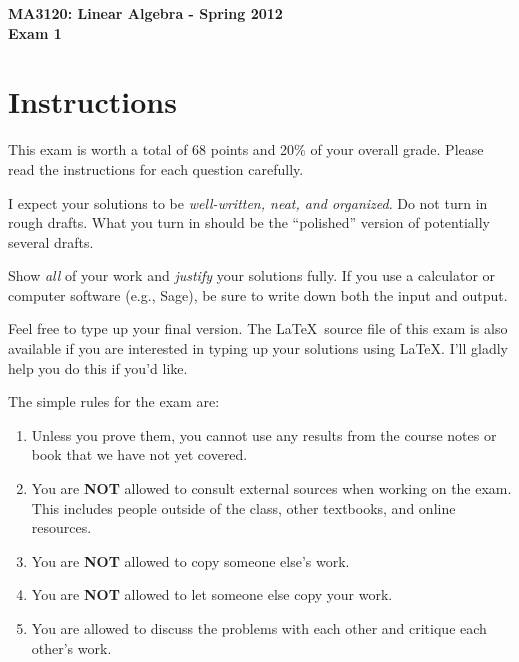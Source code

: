 \documentclass[11pt]{article}
\theoremstyle{definition}
\begin{document}
\begin{center}

{\Large\bf MA3120: Linear Algebra - Spring 2012}\\
\smallskip
{\Large\bf Exam 1}

\bigskip

  
  \bigskip
  

\end{center}

\section*{Instructions}

This exam is worth a total of 68 points and 20\% of your overall grade.  Please read the instructions for each question carefully.

\bigskip

I expect your solutions to be \emph{well-written, neat, and organized}.  Do not turn in rough drafts.  What you turn in should be the ``polished'' version of potentially several drafts.  

\bigskip

Show \emph{all} of your work and \emph{justify} your solutions fully.  If you use a calculator or computer software (e.g., Sage), be sure to write down both the input and output.

\bigskip

Feel free to type up your final version.  The \LaTeX\ source file of this exam is also available if you are interested in typing up your solutions using \LaTeX.  I'll gladly help you do this if you'd like.

\bigskip

The simple rules for the exam are:

\begin{enumerate}
\item Unless you prove them, you cannot use any results from the course notes or book that we have not yet covered.
\item You are \textbf{NOT} allowed to consult external sources when working on the exam.  This includes people outside of the class, other textbooks, and online resources.
\item You are \textbf{NOT} allowed to copy someone else's work.
\item You are \textbf{NOT} allowed to let someone else copy your work.
\item You are allowed to discuss the problems with each other and critique each other's work.
\end{enumerate}
\end{document}

